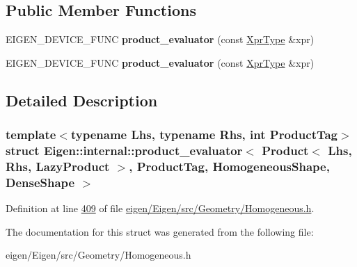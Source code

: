 \subsection*{Public Member Functions}
\begin{DoxyCompactItemize}
\item 
\mbox{\label{struct_eigen_1_1internal_1_1product__evaluator_3_01_product_3_01_lhs_00_01_rhs_00_01_lazy_produc94c394146b0a8c54b74b1b296d175015_a4908c0201a2ae11b4da54ca8cd1154ea}} 
E\+I\+G\+E\+N\+\_\+\+D\+E\+V\+I\+C\+E\+\_\+\+F\+U\+NC {\bfseries product\+\_\+evaluator} (const \hyperlink{group___core___module_class_eigen_1_1_product}{Xpr\+Type} \&xpr)
\item 
\mbox{\label{struct_eigen_1_1internal_1_1product__evaluator_3_01_product_3_01_lhs_00_01_rhs_00_01_lazy_produc94c394146b0a8c54b74b1b296d175015_a4908c0201a2ae11b4da54ca8cd1154ea}} 
E\+I\+G\+E\+N\+\_\+\+D\+E\+V\+I\+C\+E\+\_\+\+F\+U\+NC {\bfseries product\+\_\+evaluator} (const \hyperlink{group___core___module_class_eigen_1_1_product}{Xpr\+Type} \&xpr)
\end{DoxyCompactItemize}


\subsection{Detailed Description}
\subsubsection*{template$<$typename Lhs, typename Rhs, int Product\+Tag$>$\newline
struct Eigen\+::internal\+::product\+\_\+evaluator$<$ Product$<$ Lhs, Rhs, Lazy\+Product $>$, Product\+Tag, Homogeneous\+Shape, Dense\+Shape $>$}



Definition at line \hyperlink{eigen_2_eigen_2src_2_geometry_2_homogeneous_8h_source_l00409}{409} of file \hyperlink{eigen_2_eigen_2src_2_geometry_2_homogeneous_8h_source}{eigen/\+Eigen/src/\+Geometry/\+Homogeneous.\+h}.



The documentation for this struct was generated from the following file\+:\begin{DoxyCompactItemize}
\item 
eigen/\+Eigen/src/\+Geometry/\+Homogeneous.\+h\end{DoxyCompactItemize}
